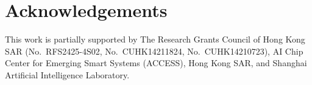 \section*{Acknowledgements}
This work is partially supported by
The Research Grants Council of Hong Kong SAR (No.~RFS2425-4S02, No.~CUHK14211824, No.~CUHK14210723), AI Chip Center for Emerging Smart Systems (ACCESS), Hong Kong SAR, and Shanghai Artificial Intelligence Laboratory.